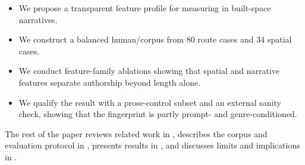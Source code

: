\begin{itemize}[leftmargin=*,itemsep=0pt,topsep=0pt]
    \item We propose a transparent feature profile for measuring \spatialgrammar in built-space narratives.
    \item We construct a balanced human/\gptmini corpus from 80 \rtr route cases and 34 spatial \writingprompts cases.
    \item We conduct feature-family ablations showing that spatial and narrative features separate authorship beyond length alone.
    \item We qualify the result with a prose-control subset and an external \longstory sanity check, showing that the fingerprint is partly prompt- and genre-conditioned.
\end{itemize}

The rest of the paper reviews related work in , describes the corpus and evaluation protocol in , presents results in , and discusses limits and implications in .
